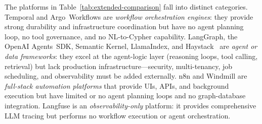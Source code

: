 \documentclass[a4paper]{sapthesis}
\begin{document}
\begin{table}[ht]
\centering
\caption{Capability comparison of the Cineca Agentic Platform (CAP) against
ten representative platforms across eight enterprise-readiness dimensions.
Y~=~built-in, P~=~partial or integration-dependent, N~=~not in scope.}
\label{tab:extended-comparison}
\small
\setlength{\tabcolsep}{3pt}
\renewcommand{\arraystretch}{1.15}
\end{table}

The platforms in Table~\ref{tab:extended-comparison} fall into distinct
categories.  Temporal and Argo~Workflows are \emph{workflow orchestration
engines}: they provide strong durability and infrastructure
coordination but have no agent planning loop, no tool governance, and no
NL-to-Cypher capability.  LangGraph, the OpenAI Agents~SDK, Semantic
Kernel, LlamaIndex, and Haystack~\cite{haystack2023} are \emph{agent or data frameworks}: they
excel at the agent-logic layer (reasoning loops, tool calling, retrieval)
but lack production infrastructure---security, multi-tenancy, job
scheduling, and observability must be added externally.  n8n and Windmill
are \emph{full-stack automation platforms} that provide UIs, APIs, and
background execution but have limited or no agent planning loops and no
graph-database integration.  Langfuse is an \emph{observability-only}
platform: it provides comprehensive LLM tracing but performs no workflow
execution or agent orchestration.
\end{document}
